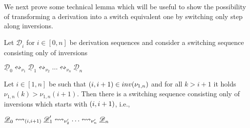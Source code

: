 \documentclass[a4paper,UKenglish,cleveref,pdftex,thm-restate,numberwithinsect,anonymous]{lipics}
\newcommand{\interval}[2][1]{\ensuremath{[{#1},{#2}]}}
\newcommand{\dder}[1]{\mathscr{#1}}
\newcommand{\der}[1]{\underline{\dder{#1}}}
\newcommand{\inv}[1]{\mathsf{inv}({#1})}
\newcommand{\shift}[1]{\ensuremath{\mathrel{{\leftrightsquigarrow}_{#1}}}}
\begin{document}
We next prove some technical lemma which will be useful to show the
possibility of transforming a derivation into a switch equivalent one
by switching only step along inversions.



\begin{lemma}
  \label{le:switchA}
  Let $\der{D}_i$ for $i \in \interval[0]{n}$ be derivation sequences
  and consider a switching sequence consisting only of inversions
  \begin{center}
    $\der{D}_0 \shift{\nu_1} \der{D}_1 \shift{\nu_2} \ldots
    \shift{\nu_n} \der{D}_n$
  \end{center}
  Let $i \in \interval{n}$ be such that
  $\transp{i} \in \inv{\nu_{1,n}}$ and for all $k > i+1$ it holds
  $\nu_{1,n}(k) > \nu_{1,n}(i+1)$.  Then there is a switching sequence
  consisting only of inversions which starts with $\transp{i}$, i.e.,
  \begin{center}
    $\der{D}_0 \shift{\transp{i}} \der{D}_1' \shift{\nu_2'} \ldots
    \shift{\nu_n'} \der{D}_n$
  \end{center}
\end{lemma}
\end{document}
